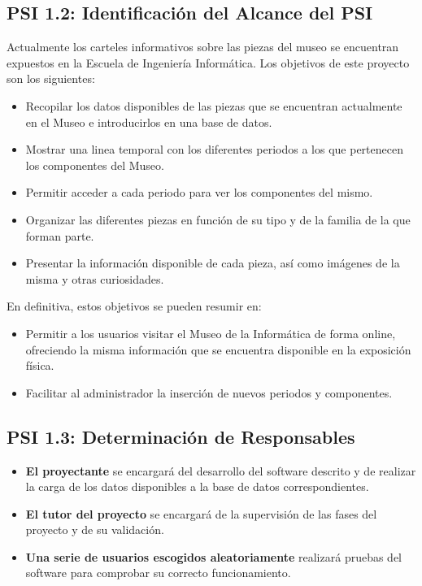 \subsection{PSI 1.2: Identificación del Alcance del PSI}
Actualmente los carteles informativos sobre las piezas del museo se encuentran expuestos en la Escuela de Ingeniería Informática. Los objetivos de este proyecto son los siguientes:
\begin{itemize}
	\item Recopilar los datos disponibles de las piezas que se encuentran actualmente en el Museo e introducirlos en una base de datos.	
	\item Mostrar una linea temporal con los diferentes periodos a los que pertenecen los componentes del Museo. 
	\item Permitir acceder a cada periodo para ver los componentes del mismo.
	\item Organizar las diferentes piezas en función de su tipo y de la familia de la que forman parte.
	\item Presentar la información disponible de cada pieza, así como imágenes de la misma y otras curiosidades.
\end{itemize}
En definitiva, estos objetivos se pueden resumir en:
\begin{itemize}
	\item Permitir a los usuarios visitar el Museo de la Informática de forma online, ofreciendo la misma información que se encuentra disponible en la exposición física.
	\item Facilitar al administrador la inserción de nuevos periodos y componentes.
\end{itemize}

\subsection{PSI 1.3: Determinación de Responsables}
\begin{itemize}
	\item \textbf{El proyectante} se encargará del desarrollo del software descrito y de realizar la carga de los datos disponibles a la base de datos correspondientes.
	\item\textbf{El tutor del proyecto} se encargará de la supervisión de las fases del proyecto y de su validación.
	\item \textbf{Una serie de usuarios escogidos aleatoriamente} realizará pruebas del software para comprobar su correcto funcionamiento.
\end{itemize}

